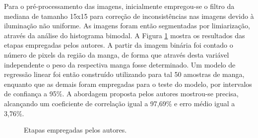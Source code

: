 Para o pré-processamento das imagens, inicialmente empregou-se o filtro da mediana de tamanho 15x15 para correção de inconsistências nas imagens devido à iluminação não uniforme. As imagens foram então segmentadas por limiarização, através da análise do histograma bimodal. A Figura \ref{img:img_art_1} mostra os resultados das etapas empregadas pelos autores. A partir da imagem binária foi contado o número de pixels da região da manga, de forma que através desta variável independente o peso da respectiva manga fosse determinado. Um modelo de regressão linear foi então construído utilizando para tal 50 amostras de manga, enquanto que as demais foram empregadas para o teste do modelo, por intervalos de confiança a 95\%. A abordagem proposta pelos autores mostrou-se precisa, alcançando um coeficiente de correlação igual a 97,69\% e erro médio igual a 3,76\%. 

\begin{figure}[!htb]
\centering
    \caption{\label{img:img_art_1} Etapas empregadas pelos autores.}
\end{figure}

